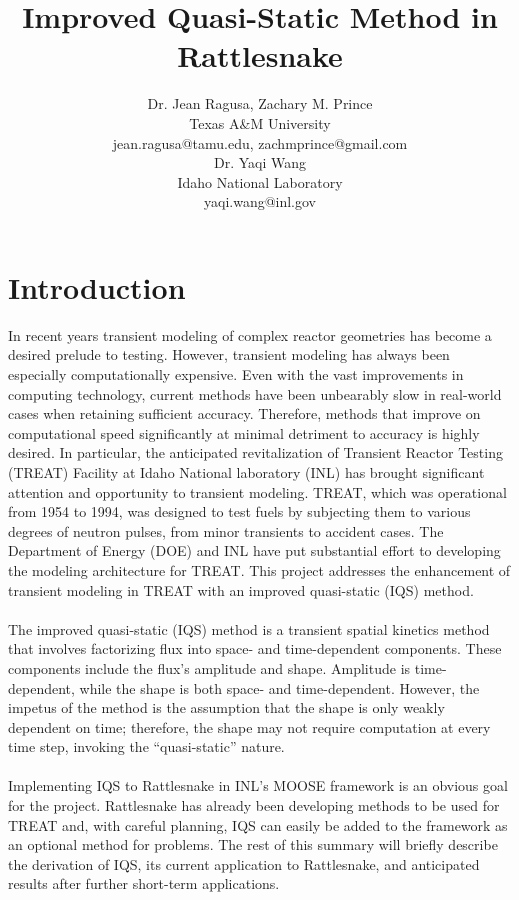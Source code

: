 \documentclass[12pt]{scrartcl}
\title{Improved Quasi-Static Method in Rattlesnake}
\author{Dr. Jean Ragusa, Zachary M. Prince \\ Texas A\&M University \\ \large jean.ragusa@tamu.edu, zachmprince@gmail.com \\ \Large Dr. Yaqi Wang \\ Idaho National Laboratory \\ \large yaqi.wang@inl.gov}
\begin{document}
\maketitle
{}

\section{Introduction}
In recent years transient modeling of complex reactor geometries has become a desired prelude to testing.  However, transient modeling has always been especially computationally expensive. Even with the vast improvements in computing technology, current methods have been unbearably slow in real-world cases when retaining sufficient accuracy.  Therefore, methods that improve on computational speed significantly at minimal detriment to accuracy is highly desired.  In particular, the anticipated revitalization of Transient Reactor Testing (TREAT) Facility at Idaho National laboratory (INL) has brought significant attention and opportunity to transient modeling.  TREAT, which was operational from 1954 to 1994, was designed to test fuels by subjecting them to various degrees of neutron pulses, from minor transients to accident cases.  The Department of Energy (DOE) and INL have put substantial effort to developing the modeling architecture for TREAT.  This project addresses the enhancement of transient modeling in TREAT with an improved quasi-static (IQS) method.
\\ \\
The improved quasi-static (IQS) method is a transient spatial kinetics method that involves factorizing flux into space- and time-dependent components.  These components include the flux’s amplitude and shape. Amplitude is time-dependent, while the shape is both space- and time-dependent.  However, the impetus of the method is the assumption that the shape is only weakly dependent on time; therefore, the shape may not require computation at every time step, invoking the “quasi-static” nature.
\\ \\
Implementing IQS to Rattlesnake in INL’s MOOSE framework is an obvious goal for the project.  Rattlesnake has already been developing methods to be used for TREAT and, with careful planning, IQS can easily be added to the framework as an optional method for problems.  The rest of this summary will briefly describe the derivation of IQS, its current application to Rattlesnake, and anticipated results after further short-term applications.
\end{document}
